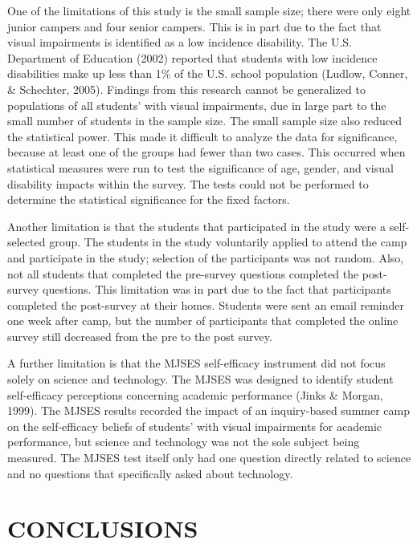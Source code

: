 \documentclass[11.5pt]{sig-alternate} %
\begin{document}
\begin{large}
One of the limitations of this study is the small sample size; there were only eight junior campers and four senior campers. This is in part due to the fact that visual impairments is identified as a low incidence disability. The U.S. Department of Education (2002) reported that students with low incidence disabilities make up less than 1\% of the U.S. school population (Ludlow, Conner, \& Schechter, 2005). Findings from this research cannot be generalized to populations of all students’ with visual impairments, due in large part to the small number of students in the sample size. The small sample size also reduced the statistical power. This made it difficult to analyze the data for significance, because at least one of the groups had fewer than two cases. This occurred when statistical measures were run to test the significance of age, gender, and visual disability impacts within the survey. The tests could not be performed to determine the statistical significance for the fixed factors.

Another limitation is that the students that participated in the study were a self-selected group. The students in the study voluntarily applied to attend the camp and participate in the study; selection of the participants was not random. Also, not all students that completed the pre-survey questions completed the post-survey questions. This limitation was in part due to the fact that participants completed the post-survey at their homes. Students were sent an email reminder one week after camp, but the number of participants that completed the online survey still decreased from the pre to the post survey.

A further limitation is that the MJSES self-efficacy instrument did not focus solely on science and technology. The MJSES was designed to identify student self-efficacy perceptions concerning academic performance (Jinks \& Morgan, 1999). The MJSES results recorded the impact of an inquiry-based summer camp on the self-efficacy beliefs of students’ with visual impairments for academic performance, but science and technology was not the sole subject being measured. The MJSES test itself only had one question directly related to science and no questions that specifically asked about technology.

\section*{CONCLUSIONS}


\end{large}
\end{document}
